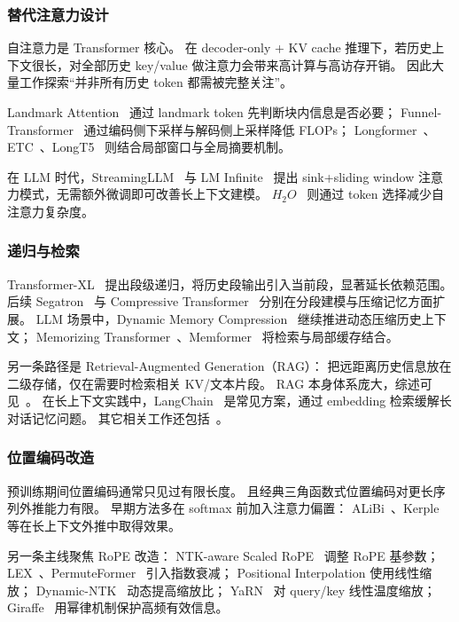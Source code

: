 \subsubsection{替代注意力设计}
\label{efficient_attention}

自注意力是 Transformer 核心。
在 decoder-only + KV cache 推理下，若历史上下文很长，对全部历史 key/value 做注意力会带来高计算与高访存开销。
因此大量工作探索“并非所有历史 token 都需被完整关注”。

Landmark Attention~\cite{mohtashami2023landmark} 通过 landmark token 先判断块内信息是否必要；
Funnel-Transformer~\cite{dai2020funnel} 通过编码侧下采样与解码侧上采样降低 FLOPs；
Longformer~\cite{beltagy2020longformer}、ETC~\cite{ainslie2020etc}、LongT5~\cite{guo2022longt5} 则结合局部窗口与全局摘要机制。

在 LLM 时代，StreamingLLM~\cite{xiao2023efficient} 与 LM Infinite~\cite{han2023lm} 提出 sink+sliding window 注意力模式，无需额外微调即可改善长上下文建模。
$H_{2}O$~\cite{zhang2024h2o} 则通过 token 选择减少自注意力复杂度。

\subsubsection{递归与检索}

Transformer-XL~\cite{dai2019transformer} 提出段级递归，将历史段输出引入当前段，显著延长依赖范围。
后续 Segatron~\cite{bai2021segatron} 与 Compressive Transformer~\cite{rae2019compressive} 分别在分段建模与压缩记忆方面扩展。
LLM 场景中，Dynamic Memory Compression~\cite{nawrot2024dynamic} 继续推进动态压缩历史上下文；
Memorizing Transformer~\cite{wu2022memorizing}、Memformer~\cite{wu2020memformer} 将检索与局部缓存结合。

另一条路径是 Retrieval-Augmented Generation（RAG）：
把远距离历史信息放在二级存储，仅在需要时检索相关 KV/文本片段。
RAG 本身体系庞大，综述可见~\cite{gao2023retrieval,zhao2024retrieval}。
在长上下文实践中，LangChain~\cite{pandya2023automating} 是常见方案，通过 embedding 检索缓解长对话记忆问题。
其它相关工作还包括~\cite{borgeaud2021improving,bertsch2024unlimiformer,zhong2023memorybank,zhou2023recurrentgpt,kynoch2023recallm,modarressi2023retllm,guu2020retrieval,wang2024augmenting}。

\subsubsection{位置编码改造}

预训练期间位置编码通常只见过有限长度。
且经典三角函数式位置编码对更长序列外推能力有限。
早期方法多在 softmax 前加入注意力偏置：
ALiBi~\cite{press2021train}、Kerple~\cite{chi2022kerple} 等在长上下文外推中取得效果。

另一条主线聚焦 RoPE 改造：
NTK-aware Scaled RoPE~\cite{xiong2023effective} 调整 RoPE 基参数；
LEX~\cite{sun2022lengthextrapolatable}、PermuteFormer~\cite{chen2021permuteformer} 引入指数衰减；
Positional Interpolation 使用线性缩放；
Dynamic-NTK~\cite{huang2019dynamics} 动态提高缩放比；
YaRN~\cite{peng2023yarn} 对 query/key 线性温度缩放；
Giraffe~\cite{pal2023giraffe} 用幂律机制保护高频有效信息。
